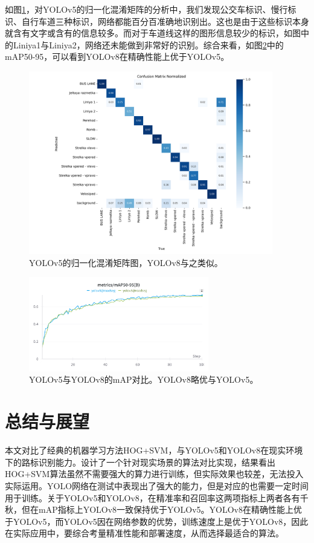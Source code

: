 \documentclass{article}
\begin{document}
如图\ref{fig:5}，对YOLOv5的归一化混淆矩阵的分析中，我们发现公交车标识、慢行标识、自行车道三种标识，网络都能百分百准确地识别出。这也是由于这些标识本身就含有文字或含有的信息较多。而对于车道线这样的图形信息较少的标识，如图中的Liniya1与Liniya2，网络还未能做到非常好的识别。综合来看，如图\ref{fig:6}中的mAP50-95，可以看到YOLOv8在精确性能上优于YOLOv5。
\begin{figure}[H]
    \centering
    \includegraphics[width=0.95\textwidth]{YOLOv5/train_yolov5/confusion_matrix_normalized.png}
    \caption{YOLOv5的归一化混淆矩阵图，YOLOv8与之类似。}
    \label{fig:5}
\end{figure}


\begin{figure}[H]
    \centering
    \includegraphics[width=0.7\textwidth]{contrast.png}
    \caption{YOLOv5与YOLOv8的mAP对比。YOLOv8略优与YOLOv5。}
    \label{fig:6}
\end{figure}

\section{总结与展望}
本文对比了经典的机器学习方法HOG+SVM，与YOLOv5和YOLOv8在现实环境下的路标识别能力。设计了一个针对现实场景的算法对比实现，结果看出HOG+SVM算法虽然不需要强大的算力进行训练，但实际效果也较差，无法投入实际运用。YOLO网络在测试中表现出了强大的能力，但是对应的也需要一定时间用于训练。关于YOLOv5和YOLOv8，在精准率和召回率这两项指标上两者各有千秋，但在mAP指标上YOLOv8一致保持优于YOLOv5。YOLOv8在精确性能上优于YOLOv5，而YOLOv5因在网络参数的优势，训练速度上是优于YOLOv8，因此在实际应用中，要综合考量精准性能和部署速度，从而选择最适合的算法。
\end{document}
